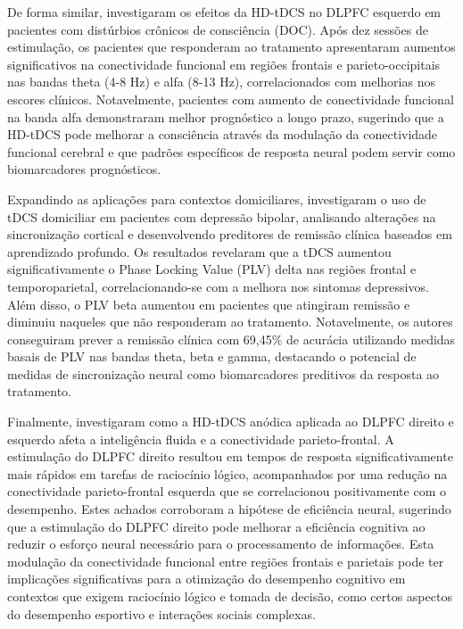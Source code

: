 De forma similar,  investigaram os efeitos da HD-tDCS no DLPFC esquerdo em pacientes com distúrbios crônicos de consciência (DOC). Após dez sessões de estimulação, os pacientes que responderam ao tratamento apresentaram aumentos significativos na conectividade funcional em regiões frontais e parieto-occipitais nas bandas theta (4-8 Hz) e alfa (8-13 Hz), correlacionados com melhorias nos escores clínicos. Notavelmente, pacientes com aumento de conectividade funcional na banda alfa demonstraram melhor prognóstico a longo prazo, sugerindo que a HD-tDCS pode melhorar a consciência através da modulação da conectividade funcional cerebral e que padrões específicos de resposta neural podem servir como biomarcadores prognósticos.

Expandindo as aplicações para contextos domiciliares,  investigaram o uso de tDCS domiciliar em pacientes com depressão bipolar, analisando alterações na sincronização cortical e desenvolvendo preditores de remissão clínica baseados em aprendizado profundo. Os resultados revelaram que a tDCS aumentou significativamente o Phase Locking Value (PLV) delta nas regiões frontal e temporoparietal, correlacionando-se com a melhora nos sintomas depressivos. Além disso, o PLV beta aumentou em pacientes que atingiram remissão e diminuiu naqueles que não responderam ao tratamento. Notavelmente, os autores conseguiram prever a remissão clínica com 69,45\% de acurácia utilizando medidas basais de PLV nas bandas theta, beta e gamma, destacando o potencial de medidas de sincronização neural como biomarcadores preditivos da resposta ao tratamento.

Finalmente,  investigaram como a HD-tDCS anódica aplicada ao DLPFC direito e esquerdo afeta a inteligência fluida e a conectividade parieto-frontal. A estimulação do DLPFC direito resultou em tempos de resposta significativamente mais rápidos em tarefas de raciocínio lógico, acompanhados por uma redução na conectividade parieto-frontal esquerda que se correlacionou positivamente com o desempenho. Estes achados corroboram a hipótese de eficiência neural, sugerindo que a estimulação do DLPFC direito pode melhorar a eficiência cognitiva ao reduzir o esforço neural necessário para o processamento de informações. Esta modulação da conectividade funcional entre regiões frontais e parietais pode ter implicações significativas para a otimização do desempenho cognitivo em contextos que exigem raciocínio lógico e tomada de decisão, como certos aspectos do desempenho esportivo e interações sociais complexas.


